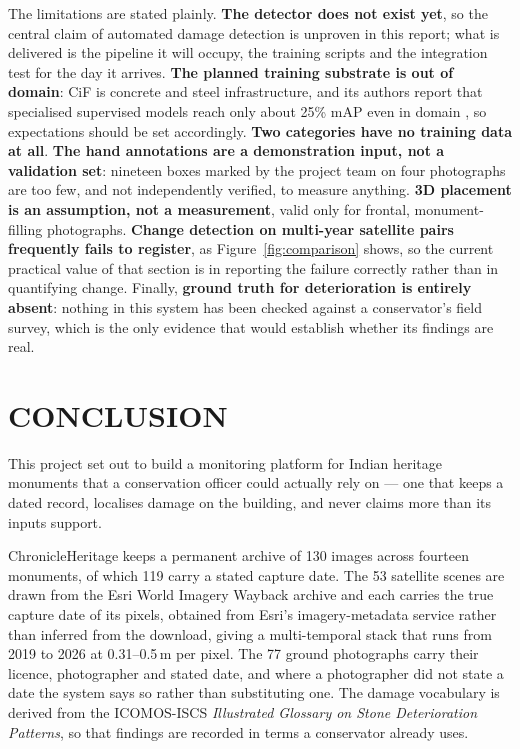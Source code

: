 \documentclass[a4paper,12pt,oneside]{book}
\begin{document}
The limitations are stated plainly. \textbf{The detector does not exist yet}, so the central claim of automated damage detection is unproven in this report; what is delivered is the pipeline it will occupy, the training scripts and the integration test for the day it arrives. \textbf{The planned training substrate is out of domain}: CiF is concrete and steel infrastructure, and its authors report that specialised supervised models reach only about 25\% mAP even in domain \cite{farronato2026cif}, so expectations should be set accordingly. \textbf{Two categories have no training data at all}. \textbf{The hand annotations are a demonstration input, not a validation set}: nineteen boxes marked by the project team on four photographs are too few, and not independently verified, to measure anything. \textbf{3D placement is an assumption, not a measurement}, valid only for frontal, monument-filling photographs. \textbf{Change detection on multi-year satellite pairs frequently fails to register}, as Figure~\ref{fig:comparison} shows, so the current practical value of that section is in reporting the failure correctly rather than in quantifying change. Finally, \textbf{ground truth for deterioration is entirely absent}: nothing in this system has been checked against a conservator's field survey, which is the only evidence that would establish whether its findings are real.

\chapter{CONCLUSION}

This project set out to build a monitoring platform for Indian heritage monuments that a conservation officer could actually rely on --- one that keeps a dated record, localises damage on the building, and never claims more than its inputs support.

ChronicleHeritage keeps a permanent archive of 130 images across fourteen monuments, of which 119 carry a stated capture date. The 53 satellite scenes are drawn from the Esri World Imagery Wayback archive and each carries the true capture date of its pixels, obtained from Esri's imagery-metadata service rather than inferred from the download, giving a multi-temporal stack that runs from 2019 to 2026 at 0.31--0.5\,m per pixel. The 77 ground photographs carry their licence, photographer and stated date, and where a photographer did not state a date the system says so rather than substituting one. The damage vocabulary is derived from the ICOMOS-ISCS \textit{Illustrated Glossary on Stone Deterioration Patterns}, so that findings are recorded in terms a conservator already uses.
\end{document}
